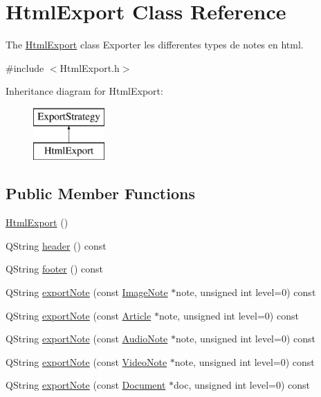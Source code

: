 \hypertarget{class_html_export}{\section{Html\-Export Class Reference}
\label{class_html_export}
}


The \hyperlink{class_html_export}{Html\-Export} class Exporter les differentes types de notes en html.  




{\ttfamily \#include $<$Html\-Export.\-h$>$}

Inheritance diagram for Html\-Export\-:\begin{figure}[H]
\begin{center}
\leavevmode
\includegraphics[height=2.000000cm]{class_html_export}
\end{center}
\end{figure}
\subsection*{Public Member Functions}
\begin{DoxyCompactItemize}
\item 
\hyperlink{class_html_export_ad3e9ef23109a5186e6bfb097d281aa03}{Html\-Export} ()
\item 
Q\-String \hyperlink{class_html_export_ab4ddebae9e5cb33919d1e88fdf082e79}{header} () const 
\item 
Q\-String \hyperlink{class_html_export_adabe03dfd8f7ff146065738b723c9fe5}{footer} () const 
\item 
Q\-String \hyperlink{class_html_export_a4f85a96d6ea2dd43e0fe697a305fb652}{export\-Note} (const \hyperlink{class_image_note}{Image\-Note} $\ast$note, unsigned int level=0) const 
\item 
Q\-String \hyperlink{class_html_export_aa3c0e1a1853a2ff1349593984472ed43}{export\-Note} (const \hyperlink{class_article}{Article} $\ast$note, unsigned int level=0) const 
\item 
Q\-String \hyperlink{class_html_export_abb65327812804624261ff18c045d3508}{export\-Note} (const \hyperlink{class_audio_note}{Audio\-Note} $\ast$note, unsigned int level=0) const 
\item 
Q\-String \hyperlink{class_html_export_ac2054bdc477561784181e3a6958b1ad2}{export\-Note} (const \hyperlink{class_video_note}{Video\-Note} $\ast$note, unsigned int level=0) const 
\item 
Q\-String \hyperlink{class_html_export_a7580dfb3b01706a6f74aae3db72637f0}{export\-Note} (const \hyperlink{class_document}{Document} $\ast$doc, unsigned int level=0) const 
\end{DoxyCompactItemize}
